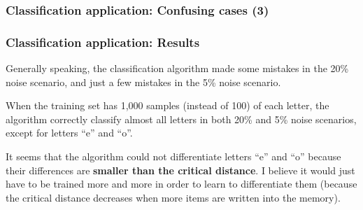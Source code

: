 \documentclass{beamer}
\begin{document}
\begin{frame}
\frametitle{Classification application: Confusing cases (3)}
\begin{figure}
  \centering


\end{figure}
\end{frame}


\begin{frame}
\frametitle{Classification application: Results}
Generally speaking, the classification algorithm made some mistakes in the 20\% noise scenario, and just a few mistakes in the 5\% noise scenario.

When the training set has 1,000 samples (instead of 100) of each letter, the algorithm correctly classify almost all letters in both 20\% and 5\% noise scenarios, except for letters ``e'' and ``o''.

It seems that the algorithm could not differentiate letters ``e'' and ``o'' because their differences are \textbf{smaller than the critical distance}. I believe it would just have to be trained more and more in order to learn to differentiate them (because the critical distance decreases when more items are written into the memory).
\end{frame}
\end{document}

